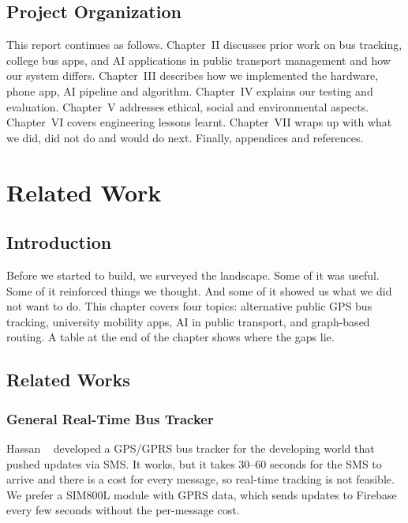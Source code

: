\documentclass[12pt,a4paper]{report}
\begin{document}
\section{Project Organization}

This report continues as follows. Chapter~II discusses prior work on bus tracking, college bus apps, and AI applications in public transport management and how our system differs. Chapter~III describes how we implemented the hardware, phone app, AI pipeline and algorithm. Chapter~IV explains our testing and evaluation. Chapter~V addresses ethical, social and environmental aspects. Chapter~VI covers engineering lessons learnt. Chapter~VII wraps up with what we did, did not do and would do next. Finally, appendices and references.

\chapter{Related Work}

\section{Introduction}

Before we started to build, we surveyed the landscape. Some of it was useful. Some of it reinforced things we thought. And some of it showed us what we did not want to do. This chapter covers four topics: alternative public GPS bus tracking, university mobility apps, AI in public transport, and graph-based routing. A table at the end of the chapter shows where the gaps lie.

\section{Related Works}

\subsection{General Real-Time Bus Tracker}

Hassan ~\cite{hassan2014gps} developed a GPS/GPRS bus tracker for the developing world that pushed updates via SMS. It works, but it takes 30--60 seconds for the SMS to arrive and there is a cost for every message, so real-time tracking is not feasible. We prefer a SIM800L module with GPRS data, which sends updates to Firebase every few seconds without the per-message cost.
\end{document}
